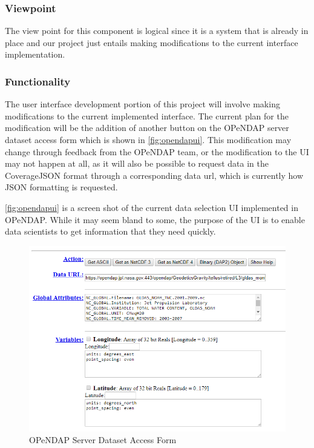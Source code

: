 \documentclass[onecolumn, draftclsnofoot,10pt, compsoc]{IEEEtran}
\begin{document}
\subsubsection{Viewpoint}
The view point for this component is logical since it is a system that is already in place and our project just entails making modifications to the current interface implementation. \cite{IEEE}

\subsubsection{Functionality}
The user interface development portion of this project will involve making modifications to the current implemented interface. The current plan for the modification will be the addition of another button on the OPeNDAP server dataset access form which is shown in \autoref{fig:opendapui}. This modification may change through feedback from the OPeNDAP team, or the modification to the UI may not happen at all, as it will also be possible to request data in the CoverageJSON format through a corresponding data url, which is currently how JSON formatting is requested.

\autoref{fig:opendapui} is a screen shot of the current data selection UI implemented in OPeNDAP. While it may seem bland to some, the purpose of the UI is to enable data scientists to get information that they need quickly. 

\begin{figure}[H]
    \centering
    \includegraphics[width=5in,scale=1.0]{opendapui.PNG}
    \caption{OPeNDAP Server Dataset Access Form}
    \label{fig:opendapui}
\end{figure}
\end{document}
